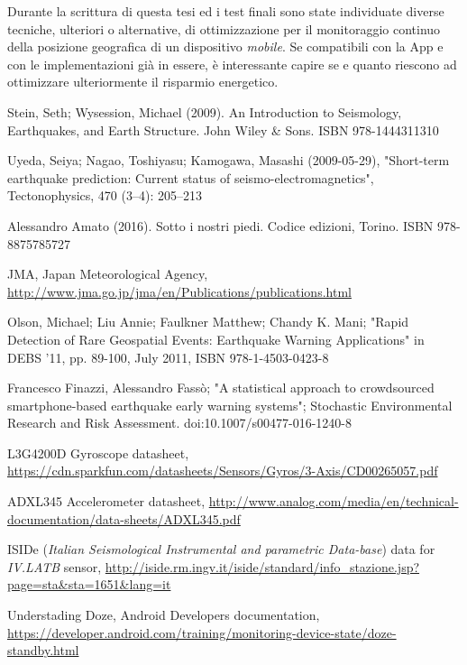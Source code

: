 \documentclass[a4paper,10pt]{memoir}
\begin{document}
Durante la scrittura di questa tesi ed i test finali sono state individuate diverse tecniche, ulteriori o alternative, di ottimizzazione \cite{altrepub} per il monitoraggio continuo della posizione geografica di un dispositivo \textit{mobile}. Se compatibili con la App e con le implementazioni già in essere, è interessante capire se e quanto riescono ad ottimizzare ulteriormente il risparmio energetico.


\begin{thebibliography}{9}

	Stein, Seth; Wysession, Michael (2009). An Introduction to Seismology, Earthquakes, and Earth Structure. John Wiley \& Sons. ISBN 978-1444311310

	Uyeda, Seiya; Nagao, Toshiyasu; Kamogawa, Masashi (2009-05-29), "Short-term earthquake prediction: Current status of seismo-electromagnetics", Tectonophysics, 470 (3–4): 205–213

	Alessandro Amato (2016). Sotto i nostri piedi. Codice edizioni, Torino. ISBN 978-8875785727

	JMA, Japan Meteorological Agency, \url{http://www.jma.go.jp/jma/en/Publications/publications.html}

	Olson, Michael; Liu Annie; Faulkner Matthew; Chandy K. Mani; "Rapid Detection of Rare Geospatial Events: Earthquake Warning Applications" in DEBS '11, pp. 89-100, July 2011, ISBN 978-1-4503-0423-8

	Francesco Finazzi, Alessandro Fassò; "A statistical approach to crowdsourced smartphone-based earthquake early warning systems"; Stochastic Environmental Research and Risk Assessment.  doi:10.1007/s00477-016-1240-8

	L3G4200D Gyroscope datasheet, \url{https://cdn.sparkfun.com/datasheets/Sensors/Gyros/3-Axis/CD00265057.pdf}

	ADXL345 Accelerometer datasheet, \url{http://www.analog.com/media/en/technical-documentation/data-sheets/ADXL345.pdf}

	ISIDe (\textit{Italian Seismological Instrumental and parametric Data-base}) data for \textit{IV.LATB} sensor, \url{http://iside.rm.ingv.it/iside/standard/info_stazione.jsp?page=sta&sta=1651&lang=it}

	Understading Doze, Android Developers documentation, \url{https://developer.android.com/training/monitoring-device-state/doze-standby.html}


\end{thebibliography}
\end{document}
